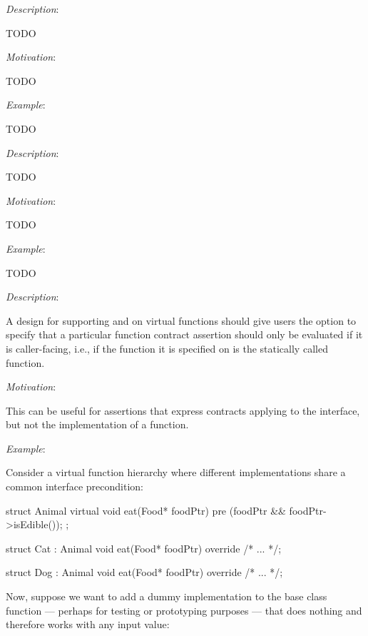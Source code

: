 \emph{Description}:

TODO

\emph{Motivation}:

TODO

\emph{Example}:

TODO 


\emph{Description}:

TODO

\emph{Motivation}:

TODO

\emph{Example}:

TODO 


\emph{Description}:

A design for supporting  and  on virtual functions should give users the option to specify that a particular function contract assertion should only be evaluated if it is caller-facing, i.e., if the function it is specified on is the statically called function.


\emph{Motivation}:




This can be useful for assertions that express contracts applying to the interface, but not the implementation of a function.

\emph{Example}:

Consider a virtual function hierarchy where different implementations share a common interface
precondition:

\begin{codeblock}
struct Animal {
  virtual void eat(Food* foodPtr)
    pre (foodPtr && foodPtr->isEdible());
};

struct Cat : Animal {
  void eat(Food* foodPtr) override
    /* ... */;
}

struct Dog : Animal {
  void eat(Food* foodPtr) override
    /* ... */;
}
\end{codeblock}

Now, suppose we want to add a dummy implementation to the base class function  --- perhaps for testing or prototyping purposes --- that does nothing and therefore works with any input value:

